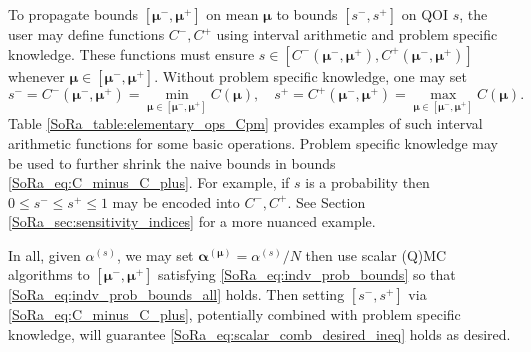 \documentclass[graybox]{svmult}
\begin{document}
To propagate bounds $[\boldsymbol{\mu}^-,\boldsymbol{\mu}^+]$ on mean $\boldsymbol{\mu}$ to bounds $[s^-,s^+]$ on QOI $s$, the user may define functions $C^-,C^+$ using interval arithmetic \cite{interval_analysis} and problem specific knowledge. These functions must ensure $s \in [C^-(\boldsymbol{\mu}^-,\boldsymbol{\mu}^+),C^+(\boldsymbol{\mu}^-,\boldsymbol{\mu}^+)]$ whenever $\boldsymbol{\mu} \in [\boldsymbol{\mu}^-,\boldsymbol{\mu}^+]$. Without problem specific knowledge, one may set 
\begin{equation}
    s^- = C^-(\boldsymbol{\mu}^-,\boldsymbol{\mu}^+) = \min_{\boldsymbol{\mu} \in [\boldsymbol{\mu}^-,\boldsymbol{\mu}^+]} C(\boldsymbol{\mu}), \quad 
    s^+= C^+(\boldsymbol{\mu}^-,\boldsymbol{\mu}^+) = \max_{\boldsymbol{\mu} \in [\boldsymbol{\mu}^-,\boldsymbol{\mu}^+]} C(\boldsymbol{\mu}).
    \label{SoRa_eq:C_minus_C_plus}
\end{equation}
Table \ref{SoRa_table:elementary_ops_Cpm} provides examples of such interval arithmetic functions for some basic operations. Problem specific knowledge may be used to further shrink the naive bounds in bounds \eqref{SoRa_eq:C_minus_C_plus}. For example, if $s$ is a probability then $0 \leq s^- \leq s^+ \leq 1$ may be encoded into $C^-,C^+$. See Section \ref{SoRa_sec:sensitivity_indices} for a more nuanced example. 

In all, given $\alpha^{(s)}$, we may set $\boldsymbol{\alpha}^{(\boldsymbol{\mu})}=\alpha^{(s)}/N$ then use scalar (Q)MC  algorithms to $[\boldsymbol{\mu}^-,\boldsymbol{\mu}^+]$ satisfying \eqref{SoRa_eq:indv_prob_bounds} so that \eqref{SoRa_eq:indv_prob_bounds_all} holds. Then setting $[s^-,s^+]$ via \eqref{SoRa_eq:C_minus_C_plus}, potentially combined with problem specific knowledge, will guarantee \eqref{SoRa_eq:scalar_comb_desired_ineq} holds as desired.
\end{document}
